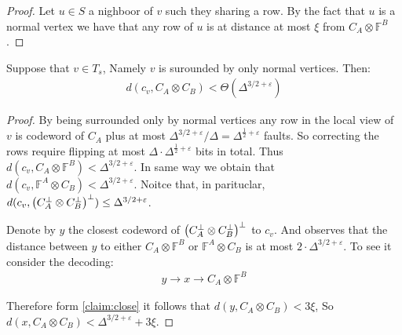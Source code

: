  \begin{proof}
   Let $u \in S$ a nighboor of $v$ such they sharing a row. By the fact that $u$ is a normal vertex we have that any row of $u$ is at distance at most $\xi$ from $C_{A} \otimes \mathbb{F}^{B}$.     
 \end{proof}
\begin{claim}
  \label{claim:closeto}
  Suppose that $v \in T_{s}$, Namely $v$ is surounded by only normal vertices. Then:
  \begin{equation*}
    \begin{split}
      d\left( c_{v}, C_{A}\otimes C_{B}\right) < \Theta\left( \Delta^{3/2+\varepsilon} \right)
    \end{split}
  \end{equation*} 
 \end{claim}
\begin{proof}
  By being surrounded only by normal vertices any row in the local view of $v$ is codeword of $C_{A}$ plus at most $\Delta^{3/2 + \varepsilon}/\Delta = \Delta^{\frac{1}{2}+\varepsilon}$ faults. So correcting the rows require flipping at most $\Delta \cdot \Delta^{\frac{1}{2} + \varepsilon}$ bits in total.  Thus $d\left(c_{v}, C_{A}\otimes \mathbb{F}^{B}\right) < \Delta^{3/2 + \varepsilon}$. In same way we obtain that $d\left(c_{v},  \mathbb{F}^{A} \otimes C_{B}\right) < \Delta^{3/2 + \varepsilon}$. Noitce that, in parituclar, $d(c_{v}, \left( C_{A}^{\perp}\otimes C_{B}^{\perp} \right)^{\perp}) \le \Delta^{3/2 + \varepsilon}$.

  Denote by $y$ the closest codeword of $\left( C_{A}^{\perp}\otimes C_{B}^{\perp} \right)^{\perp}$ to $c_{v}$. And observes that the distance between $y$ to either $C_{A} \otimes \mathbb{F}^{B}$ or $\mathbb{F}^{A}\otimes C_{B}$ is at most $2 \cdot \Delta^{3/2 + \varepsilon}$. To see it consider the decoding: 
  \begin{equation*}
    \begin{split}
  y \rightarrow x \rightarrow C_{A} \otimes \mathbb{F}^{B}   
    \end{split}
  \end{equation*}
  
  Therefore form \cref{claim:close} it follows that $d\left(y, C_{A} \otimes C_{B}\right) < 3 \xi $, So $d\left(x, C_{A} \otimes C_{B}\right) < \Delta^{3/2 + \varepsilon} +  3 \xi $.
     \end{proof}
 
 \begin{remark}
   
 \end{remark}

